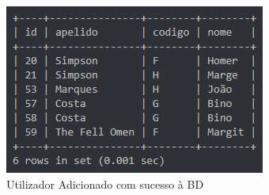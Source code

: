 \documentclass[11pt,a4paper]{report}%
\begin{document}
\begin{figure}[h!]
\centering
\includegraphics[scale=1.6]{Pictures/InserçãoBD.png}
\caption{\label{fig:Diagrama} Utilizador Adicionado com sucesso à BD}
\end{figure}

\cite{*} %



\end{document}

